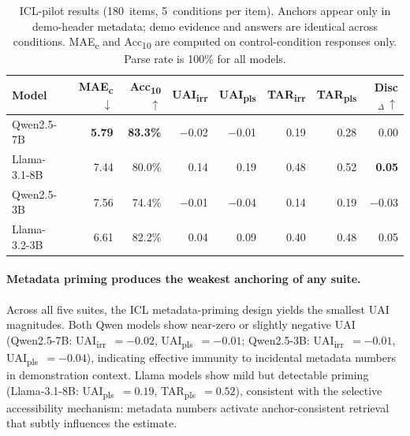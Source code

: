 \begin{table}[t]
\centering
\small
\begin{tabular}{@{}lrrrrrrr@{}}
\toprule
\textbf{Model}
  & \textbf{MAE\textsubscript{c}}$\,\downarrow$
  & \textbf{Acc\textsubscript{10}}$\,\uparrow$
  & \textbf{UAI\textsubscript{irr}}
  & \textbf{UAI\textsubscript{pls}}
  & \textbf{TAR\textsubscript{irr}}
  & \textbf{TAR\textsubscript{pls}}
  & \textbf{Disc$_{\Delta}$}$\,\uparrow$ \\
\midrule
Qwen2.5-7B    & \textbf{5.79}  & \textbf{83.3\%} & $-$0.02 & $-$0.01 & 0.19 & 0.28 & 0.00 \\
Llama-3.1-8B  & 7.44  & 80.0\% & 0.14  & 0.19 & 0.48 & 0.52 & \textbf{0.05} \\
Qwen2.5-3B    & 7.56  & 74.4\% & $-$0.01 & $-$0.04 & 0.14 & 0.19 & $-$0.03 \\
Llama-3.2-3B  & 6.61  & 82.2\% & 0.04  & 0.09 & 0.40 & 0.48 & 0.05 \\
\bottomrule
\end{tabular}
\caption{ICL-pilot results (180~items, 5~conditions per
  item).  Anchors appear only in demo-header metadata;
  demo evidence and answers are identical across conditions.
  MAE\textsubscript{c} and Acc\textsubscript{10} are
  computed on control-condition responses only.
  Parse rate is 100\% for all models.}
\label{tab:icl_results}
\end{table}

\paragraph{Metadata priming produces the weakest anchoring
  of any suite.}
Across all five suites, the ICL metadata-priming design
yields the smallest UAI magnitudes.
Both Qwen models show near-zero or slightly negative UAI
(Qwen2.5-7B: UAI\textsubscript{irr}~$= -0.02$,
UAI\textsubscript{pls}~$= -0.01$; Qwen2.5-3B:
UAI\textsubscript{irr}~$= -0.01$,
UAI\textsubscript{pls}~$= -0.04$), indicating effective
immunity to incidental metadata numbers in demonstration
context.
Llama models show mild but detectable priming
(Llama-3.1-8B: UAI\textsubscript{pls}~$= 0.19$,
TAR\textsubscript{pls}~$= 0.52$), consistent with the
selective accessibility mechanism: metadata numbers
activate anchor-consistent retrieval that subtly influences
the estimate.

